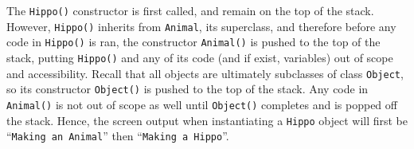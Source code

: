 \documentclass{tufte-handout}
\begin{document}
    \begin{center}
    \end{center}

    The \texttt{Hippo()} constructor is first called, and remain on the top of the stack. However, \texttt{Hippo()} inherits from \texttt{Animal}, its superclass, and therefore before any code in \texttt{Hippo()} is ran, the constructor \texttt{Animal()} is pushed to the top of the stack, putting \texttt{Hippo()} and any of its code (and if exist, variables) out of scope and accessibility. Recall that all objects are ultimately subclasses of class \texttt{Object}, so its constructor \texttt{Object()} is pushed to the top of the stack. Any code in \texttt{Animal()} is not out of scope as well until \texttt{Object()} completes and is popped off the stack. Hence, the screen output when instantiating a \texttt{Hippo} object will first be ``\texttt{Making an Animal}'' then ``\texttt{Making a Hippo}''. 
\end{document}

